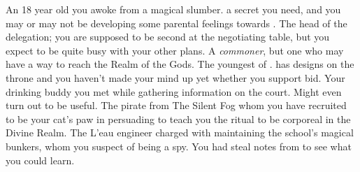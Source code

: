 \documentclass[char]{GL2020}
\begin{document}
\begin{contacts}
	\contact{\cDisney{}} An 18 year old \cDisney{\child} you awoke from a magical slumber. \cDisney{\They} \cDisney{\have} a secret you need, and you may or may not be developing some parental feelings towards \cDisney{\them}.
	\contact{\cEvil{}} The head of the \pFarm{} delegation; you are supposed to be \cEvil{\their} second at the negotiating table, but you expect to be quite busy with your other plans.
	\contact{\cCurse{}} A \emph{commoner}, but one who may have a way to reach the Realm of the Gods.
	\contact{\cPrince{}} The youngest \cPrince{\child} of \cQueen{\Majesty} \cQueen{}. \cPrince{} has designs on the throne and you haven’t made your mind up yet whether you support \cPrince{\their} bid.
	\contact{\cHedonist{}} Your \cHedonist{\cleric} drinking buddy you met while gathering information on the court. Might even turn out to be useful.
	\contact{\cPirateChild{}} The pirate \cPirateChild{\kid} from The Silent Fog whom you have recruited to be your cat’s paw in persuading \cDisney{} to teach you the ritual to be corporeal in the Divine Realm.
	\contact{\cBunker{}} The L’eau engineer charged with maintaining the school’s magical bunkers, whom you suspect of being a spy. You had \cDisney{} steal notes from \cBunker{\them} to see what you could learn.
\end{contacts}
\end{document}
